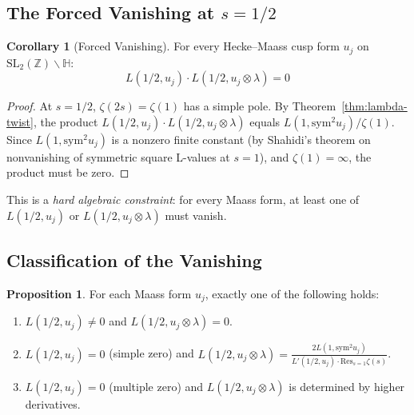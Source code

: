 \documentclass[11pt,a4paper]{article}
\theoremstyle{definition}
\newtheorem{proposition}[theorem]{Proposition}
\newtheorem{corollary}[theorem]{Corollary}
\newcommand{\SL}{\mathrm{SL}}
\newcommand{\Sym}{\mathrm{sym}}
\newcommand{\Res}{\mathrm{Res}}
\begin{document}
\subsection{The Forced Vanishing at $s = 1/2$}

\begin{corollary}[Forced Vanishing]
\label{cor:forced-vanishing}
For every Hecke--Maass cusp form $u_j$ on $\SL_2(\mathbb{Z})\backslash\mathbb{H}$:
\begin{equation}
L(1/2, u_j) \cdot L(1/2, u_j \otimes \lambda) = 0
\end{equation}
\end{corollary}

\begin{proof}
At $s = 1/2$, $\zeta(2s) = \zeta(1)$ has a simple pole. By Theorem~\ref{thm:lambda-twist}, the product $L(1/2, u_j) \cdot L(1/2, u_j \otimes \lambda)$ equals $L(1, \Sym^2 u_j)/\zeta(1)$. Since $L(1, \Sym^2 u_j)$ is a nonzero finite constant (by Shahidi's theorem on nonvanishing of symmetric square L-values at $s=1$), and $\zeta(1) = \infty$, the product must be zero.
\end{proof}

This is a \emph{hard algebraic constraint}: for every Maass form, at least one of $L(1/2, u_j)$ or $L(1/2, u_j \otimes \lambda)$ must vanish.

\subsection{Classification of the Vanishing}

\begin{proposition}
\label{prop:classification}
For each Maass form $u_j$, exactly one of the following holds:
\begin{enumerate}
\item $L(1/2, u_j) \neq 0$ and $L(1/2, u_j \otimes \lambda) = 0$.
\item $L(1/2, u_j) = 0$ (simple zero) and $L(1/2, u_j \otimes \lambda) = \frac{2L(1, \Sym^2 u_j)}{L'(1/2, u_j) \cdot \Res_{s=1}\zeta(s)}$.
\item $L(1/2, u_j) = 0$ (multiple zero) and $L(1/2, u_j \otimes \lambda)$ is determined by higher derivatives.
\end{enumerate}
\end{proposition}
\end{document}
